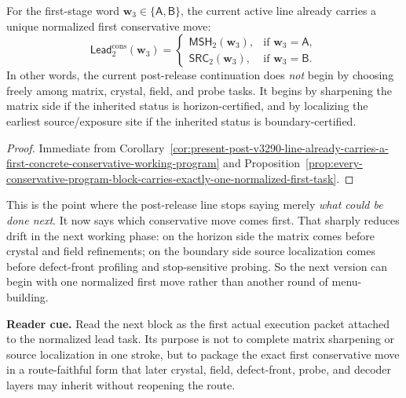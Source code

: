 \begin{corollary}
\label{cor:present-post-v3290-line-already-carries-a-unique-first-conservative-move}
For the first-stage word \(\mathbf w_3\in\{\mathsf A,\mathsf B\}\), the current active line already carries a unique normalized first conservative move:
\[
 \mathsf{Lead}^{\mathrm{cons}}_{2}(\mathbf w_3)
 =
 \begin{cases}
 \mathsf{MSH}_{2}(\mathbf w_3), & \text{if }\mathbf w_3=\mathsf A,\\[2mm]
 \mathsf{SRC}_{2}(\mathbf w_3), & \text{if }\mathbf w_3=\mathsf B.
 \end{cases}
\]
In other words, the current post-release continuation does \emph{not} begin by choosing freely among matrix, crystal, field, and probe tasks. It begins by sharpening the matrix side if the inherited status is horizon-certified, and by localizing the earliest source/exposure site if the inherited status is boundary-certified.
\end{corollary}

\begin{proof}
Immediate from Corollary~\ref{cor:present-post-v3290-line-already-carries-a-first-concrete-conservative-working-program} and Proposition~\ref{prop:every-conservative-program-block-carries-exactly-one-normalized-first-task}.
\end{proof}

\begin{remark}
\label{rem:what-the-lead-task-extraction-now-buys}
This is the point where the post-release line stops saying merely \emph{what could be done next}. It now says which conservative move comes first. That sharply reduces drift in the next working phase: on the horizon side the matrix comes before crystal and field refinements; on the boundary side source localization comes before defect-front profiling and stop-sensitive probing. So the next version can begin with one normalized first move rather than another round of menu-building.
\end{remark}



\noindent\textbf{Reader cue.} Read the next block as the first actual execution packet attached to the normalized lead task. Its purpose is not to complete matrix sharpening or source localization in one stroke, but to package the exact first conservative move in a route-faithful form that later crystal, field, defect-front, probe, and decoder layers may inherit without reopening the route.

